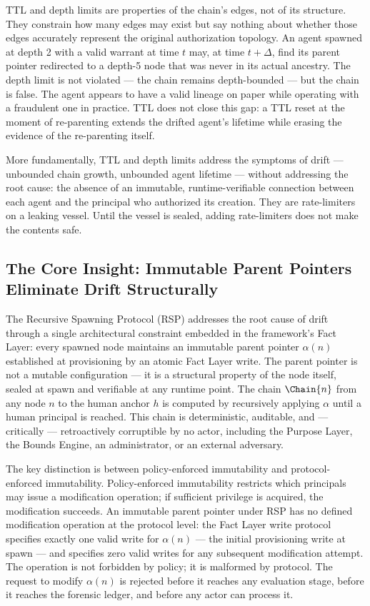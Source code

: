 TTL and depth limits are properties of the chain's edges, not of its structure. They constrain how many edges may exist but say nothing about whether those edges accurately represent the original authorization topology. An agent spawned at depth 2 with a valid warrant at time $t$ may, at time $t+\Delta$, find its parent pointer redirected to a depth-5 node that was never in its actual ancestry. The depth limit is not violated — the chain remains depth-bounded — but the chain is false. The agent appears to have a valid lineage on paper while operating with a fraudulent one in practice. TTL does not close this gap: a TTL reset at the moment of re-parenting extends the drifted agent's lifetime while erasing the evidence of the re-parenting itself.

More fundamentally, TTL and depth limits address the symptoms of drift — unbounded chain growth, unbounded agent lifetime — without addressing the root cause: the absence of an immutable, runtime-verifiable connection between each agent and the principal who authorized its creation. They are rate-limiters on a leaking vessel. Until the vessel is sealed, adding rate-limiters does not make the contents safe.

\subsection{The Core Insight: Immutable Parent Pointers Eliminate Drift Structurally}
\label{sec:core-insight}

The Recursive Spawning Protocol (RSP) addresses the root cause of drift through a single architectural constraint embedded in the \bxthree{} framework's Fact Layer: every spawned node maintains an immutable parent pointer $\alpha(n)$ established at provisioning by an atomic Fact Layer write. The parent pointer is not a mutable configuration — it is a structural property of the node itself, sealed at spawn and verifiable at any runtime point. The chain $\Chain{n}$ from any node $n$ to the human anchor $h$ is computed by recursively applying $\alpha$ until a human principal is reached. This chain is deterministic, auditable, and — critically — retroactively corruptible by no actor, including the Purpose Layer, the Bounds Engine, an administrator, or an external adversary.

The key distinction is between policy-enforced immutability and protocol-enforced immutability. Policy-enforced immutability restricts which principals may issue a modification operation; if sufficient privilege is acquired, the modification succeeds. An immutable parent pointer under RSP has no defined modification operation at the protocol level: the Fact Layer write protocol specifies exactly one valid write for $\alpha(n)$ — the initial provisioning write at spawn — and specifies zero valid writes for any subsequent modification attempt. The operation is not forbidden by policy; it is malformed by protocol. The request to modify $\alpha(n)$ is rejected before it reaches any evaluation stage, before it reaches the forensic ledger, and before any actor can process it.

